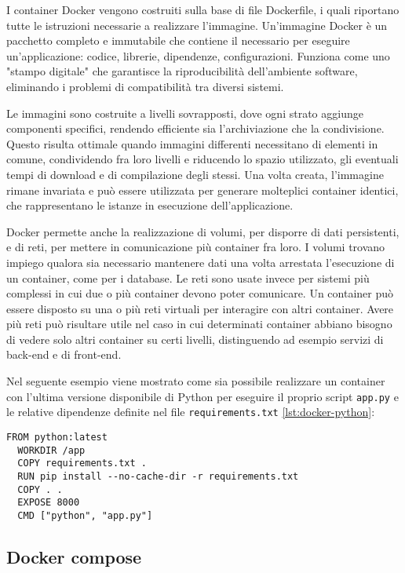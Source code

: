 I container Docker vengono costruiti sulla base di file Dockerfile, i quali riportano tutte le istruzioni necessarie a realizzare l'immagine. Un'immagine Docker è un pacchetto completo e immutabile che contiene il necessario per eseguire un'applicazione: codice, librerie, dipendenze, configurazioni. Funziona come uno "stampo digitale" che garantisce la riproducibilità dell'ambiente software, eliminando i problemi di compatibilità tra diversi sistemi.

Le immagini sono costruite a livelli sovrapposti, dove ogni strato aggiunge componenti specifici, rendendo efficiente sia l'archiviazione che la condivisione. Questo risulta ottimale quando immagini differenti necessitano di elementi in comune, condividendo fra loro livelli e riducendo lo spazio utilizzato, gli eventuali tempi di download e di compilazione degli stessi. Una volta creata, l'immagine rimane invariata e può essere utilizzata per generare molteplici container identici, che rappresentano le istanze in esecuzione dell'applicazione.

Docker permette anche la realizzazione di volumi, per disporre di dati persistenti, e di reti, per mettere in comunicazione più container fra loro. I volumi trovano impiego qualora sia necessario mantenere dati una volta arrestata l'esecuzione di un container, come per i database. Le reti sono usate invece per sistemi più complessi in cui due o più container devono poter comunicare. Un container può essere disposto su una o più reti virtuali per interagire con altri container. Avere più reti può risultare utile nel caso in cui determinati container abbiano bisogno di vedere solo altri container su certi livelli, distinguendo ad esempio servizi di back-end e di front-end.

Nel seguente esempio viene mostrato come sia possibile realizzare un container con l'ultima versione disponibile di Python per eseguire il proprio script \texttt{app.py} e le relative dipendenze definite nel file \texttt{requirements.txt} \ref{lst:docker-python}:

\begin{lstlisting}[caption={Dockerfile Python}, label=lst:docker-python]
  FROM python:latest
  WORKDIR /app
  COPY requirements.txt .
  RUN pip install --no-cache-dir -r requirements.txt
  COPY . .
  EXPOSE 8000
  CMD ["python", "app.py"]
\end{lstlisting}

\subsection{Docker compose}

